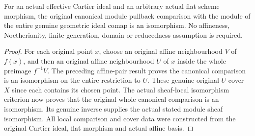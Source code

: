 \begin{theorem}
\label{thm:actual-cartier-module-global-flat-pullback}
\leanok
{}
For an actual effective Cartier ideal and an arbitrary actual flat scheme
morphism, the original canonical module pullback comparison with the
module of the entire genuine geometric ideal comap is an isomorphism.
No affineness, Noetherianity, finite-generation, domain or reducedness
assumption is required.
\end{theorem}
\begin{proof}
For each original point $x$, choose an original affine neighbourhood $V$
of $f(x)$, and then an original affine neighbourhood $U$ of $x$ inside
the whole preimage $f^{-1}V$. The preceding affine-pair result proves the
canonical comparison is an isomorphism on the entire restriction to
$U$. These genuine original $U$ cover $X$ since each contains its chosen
point. The actual sheaf-local isomorphism criterion now proves that the
original whole canonical comparison is an isomorphism. Its genuine
inverse supplies the actual stated module sheaf isomorphism. All local
comparison and cover data were constructed from the original Cartier
ideal, flat morphism and actual affine basis.
\end{proof}
